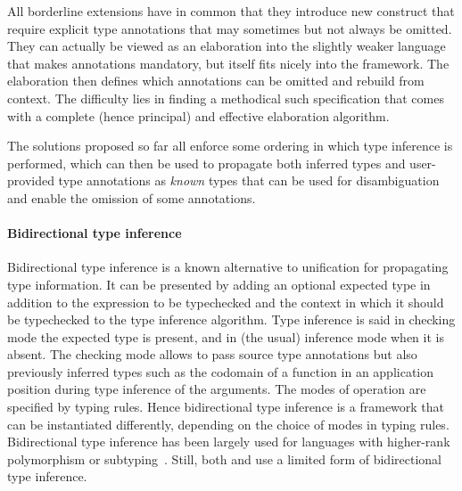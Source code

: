 \documentclass[acmsmall,screen,nonacm]{acmart}
\begin{document}
All borderline extensions have in common that they introduce new construct
that require explicit type annotations that may sometimes but not always be
omitted. They can actually be viewed as an elaboration into the slightly weaker
language that makes annotations mandatory, but itself fits nicely into
the \ML framework. The elaboration then defines which annotations can be
omitted and rebuild from context. 
%
The difficulty lies in finding a methodical such specification  that comes
with a complete (hence principal) and effective elaboration algorithm.

The solutions proposed so far all enforce some ordering in which type
inference is performed, which can then be used to propagate both inferred
types and user-provided type annotations as \emph{known} types that can be
used for disambiguation and enable the omission of some annotations.

\paragraph{Bidirectional type inference}

Bidirectional type inference is a known alternative to unification for
propagating type information. It can be presented by adding an optional
expected type in addition to the expression to be typechecked and the
context in which it should be typechecked to the type inference algorithm.
Type inference is said in checking mode the expected type is present, and in
(the usual) inference mode when it is absent. The checking mode allows to
pass source type annotations but also previously inferred types such as the
codomain of a function in an application position during type inference of
the arguments.  The modes of operation are specified by typing rules.  Hence
bidirectional type inference is a framework that can be instantiated
differently, depending on the choice of modes in typing rules.
Bidirectional type inference has been largely used for languages with
higher-rank polymorphism or subtyping~. Still, both \OCaml
and \Haskell use a limited form of bidirectional type inference.

\end{document}

